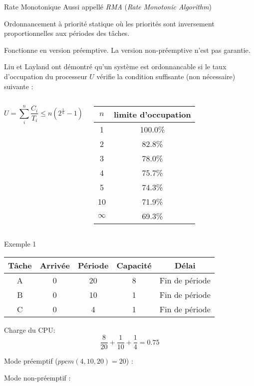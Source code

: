 \begin{frame}{Rate Monotonique}
  Aussi appellé \emph{RMA} (\emph{Rate Monotonic Algorithm})

  Ordonnancement à priorité statique où les priorités sont inversement
  proportionnelles aux périodes des tâches. 

  Fonctionne  en version préemptive.  La version  non-préemptive n'est
  pas garantie.

  Liu et Layland ont démontré qu'un système est ordonnancable si le
  taux d'occupation du processeur $U$ vérifie la condition suffisante
  (non nécessaire) suivante :

  \begin{columns}
      $$U = \sum_i^n \frac{C_i}{T_i} ≤ n \left(2^{\frac{1}{n}}-1\right)$$

      \begin{center}
        \begin{tabular}{cc}
          \hline
          $n$ & limite d'occupation \\
          \hline
          1 & 100.0\% \\
          2 & 82.8\% \\
          3 & 78.0\% \\
          4 & 75.7\% \\
          5 & 74.3\% \\
          10 & 71.9\% \\
          $\infty$ & 69.3\%\\
          \hline
        \end{tabular}
      \end{center}
  \end{columns}
\end{frame}

\begin{frame}{Exemple 1}
  \begin{center}
    \begin{tabular}{ccccc}
      \hline
      Tâche & Arrivée & Période & Capacité & Délai \\
      \hline
      A & 0 & 20 & 8 & Fin de période\\
      B & 0 & 10 & 1 & Fin de période\\
      C & 0 &  4 & 1 & Fin de période\\
      \hline
    \end{tabular}
  \end{center}
  \begin{overprint}
    Charge du CPU:
    $$\frac{8}{20} + \frac{1}{10} + \frac{1}{4} = 0.75$$
    
    Mode préemptif ($ppcm(4, 10, 20) = 20$) :
    \begin{center}
      
    \end{center}

    Mode non-préemptif :
    \begin{center}
      
    \end{center}
  \end{overprint}
\end{frame}

